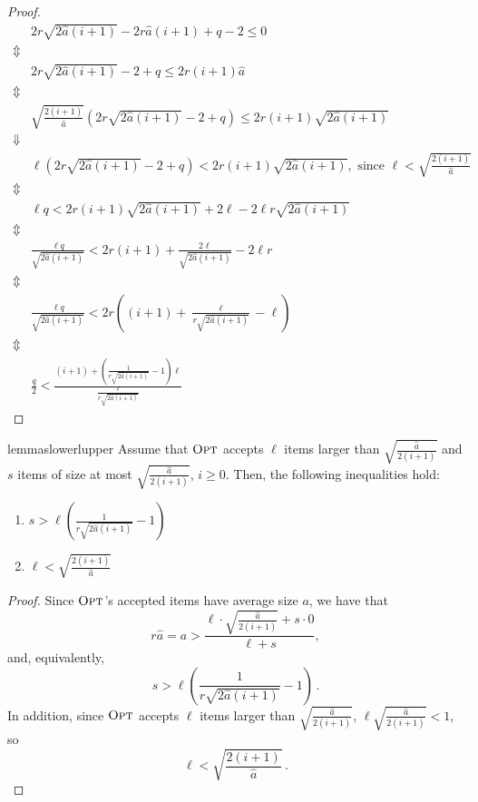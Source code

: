 \documentclass[a4paper,UKenglish,cleveref, autoref, thm-restate]{lipics-v2021}
\newcommand{\OPT}{\ensuremath{\operatorname{\textsc{Opt}}}\xspace}
\newcommand{\guess}{\ensuremath{\hat{a}}\xspace}
\begin{document}
\begin{proof}
  \[\begin{array}{cl}
      &  2r\sqrt{2\guess(i+1)}-2r\guess(i+1)+q-2 \leq 0 \\
      \Updownarrow \\
      &  2r\sqrt{2\guess(i+1)}-2+q \leq 2r(i+1)\guess \\
      \Updownarrow \\
      &  \sqrt{\frac{2(i+1)}{\guess}}(2r\sqrt{2\guess(i+1)}-2+q) \leq 2r(i+1)\sqrt{2\guess(i+1)} \\
      \Downarrow \\
      &  \ell(2r\sqrt{2\guess(i+1)}-2+q) <2r(i+1)\sqrt{2\guess(i+1)}, \text{ since } \ell < \sqrt{\frac{2(i+1)}{\guess}} \\
      \Updownarrow \\
      &  \ell q< 2r(i+1)\sqrt{2\guess(i+1)}+2\ell-2\ell r\sqrt{2\guess(i+1)} \\
      \Updownarrow \\
      &  \frac{\ell q}{\sqrt{2\guess(i+1)}}< 2r(i+1)+\frac{2\ell}{\sqrt{2\guess(i+1)}}-2\ell r \\
      \Updownarrow \\
      &  \frac{\ell q}{\sqrt{2\guess(i+1)}}< 2r((i+1)+\frac{\ell}{r\sqrt{2\guess(i+1)}}-\ell)  \\
      \Updownarrow \\
      &   \frac{q}{2} < \frac{(i+1)+\left(
        \frac{1}{r\sqrt{2\guess(i+1)}} -1\right)\ell}{\frac{\ell}{r\sqrt{2\guess(i+1)}}}
\end{array}\]
\end{proof}

\begin{restatable}{lemma}{slowerlupper}
  \label{lemma:slowerlupper}
  Assume that $\OPT$ accepts $\ell$ items larger than
  $\sqrt{\frac{\guess}{2(i+1)}}$ and $s$ items of size at most
  $\sqrt{\frac{\guess}{2(i+1)}}$, $i \geq 0$.  Then, the following
  inequalities hold:
    \begin{enumerate}
    \item
      $\displaystyle s >
      \ell\left(\frac{1}{r\sqrt{2\guess(i+1)}}-1\right)$ \label{slower}
    \item $\displaystyle \ell < \sqrt{\frac{2(i+1)}{\guess}}$ \label{lupper}
    \end{enumerate}
\end{restatable}
\begin{proof}
  Since \OPT's accepted items have average size $a$, we have that
  \[r\guess=a > \frac{\ell\cdot\sqrt{\frac{\guess}{2(i+1)}}+s\cdot 0}{\ell+s},\]
  and, equivalently,
\begin{equation*}
  s > \ell\left(\frac{1}{r\sqrt{2\guess(i+1)}}-1\right)\,.
  \end{equation*}
In addition, since \OPT accepts $\ell$ items larger than
$\sqrt{\frac{\guess}{2(i+1)}}$,
$\ell\sqrt{\frac{\guess}{2(i+1)}}<1$, so
\begin{equation*}
  \ell < \sqrt{\frac{2(i+1)}{\guess}}\,.
  \end{equation*}
\end{proof}
\end{document}
